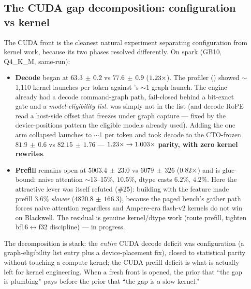 \documentclass[11pt]{article}
\begin{document}
\subsection{The CUDA gap decomposition: configuration vs kernel}
\label{sec:cuda}

The CUDA front is the cleanest natural experiment separating configuration from kernel work, because its two
phases resolved differently. On spark (GB10,  Q4\_K\_M, same-run):

\begin{itemize}[leftmargin=1.4em,itemsep=1pt,topsep=2pt]
\item \textbf{Decode} began at $63.3\,{\pm}\,0.2$ vs  $77.6\,{\pm}\,0.9$ ($1.23\times$). The
profiler () showed $\sim$1{,}110 kernel launches per token against 's $\sim$1 graph
launch. The engine already had a decode command-graph path, fail-closed behind a bit-exact gate and a
\emph{model-eligibility list}.  was simply not in the list (and decode RoPE read a
host-side offset that freezes under graph capture --- fixed by the device-positions pattern the eligible
models already used). Adding the one arm collapsed launches to $\sim$1 per token and took decode to the
CTO-frozen $81.9\,{\pm}\,0.6$ vs  $82.15\,{\pm}\,1.76$ --- $1.23\times\to1.003\times$ \textbf{parity,
with zero kernel rewrites}.
\item \textbf{Prefill} remains open at $5003.4\,{\pm}\,23.0$ vs  $6079\,{\pm}\,326$ ($0.82\times$)
and is glue-bound: naive attention  $\sim$13--15\%,  $10.5\%$, dtype
casts $6.2\%$,  $4.2\%$. Here the attractive lever was itself refuted (\#25): building with the
 feature made prefill $3.6\%$ \emph{slower} ($4820.8\,{\pm}\,166.3$), because the paged
bench's gather path forces naive attention regardless and Ampere-era flash-v2 kernels do not win on
Blackwell. The residual is genuine kernel/dtype work (route  prefill, tighten
bf16$\leftrightarrow$f32 discipline) --- in progress.
\end{itemize}

The decomposition is stark: the \emph{entire} CUDA decode deficit was configuration (a graph-eligibility
list entry plus a device-placement fix), closed to statistical parity without touching a compute kernel;
the CUDA prefill deficit is what is actually left for kernel engineering. When a fresh front is opened, the
prior that ``the gap is plumbing'' pays before the prior that ``the gap is a slow kernel.''
\end{document}
